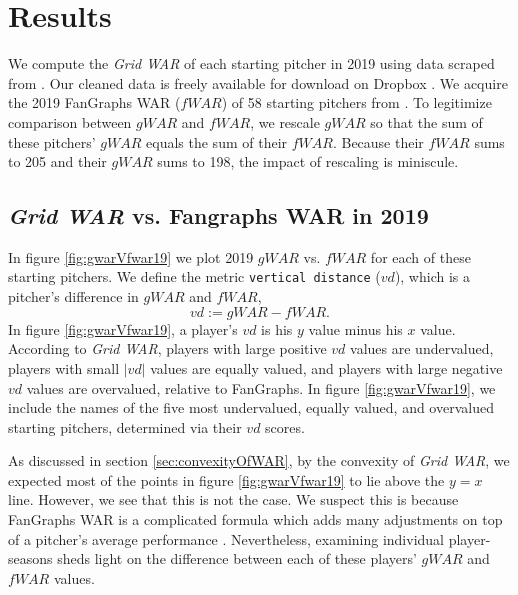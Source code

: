 \documentclass[12pt]{article}
\begin{document}
\section{Results}

We compute the \textit{Grid WAR} of each starting pitcher in 2019 using data scraped from \citet{retroRaw}. Our cleaned data is freely available for download on Dropbox \citep{dropboxRetrosheet}. We acquire the 2019 FanGraphs WAR ($fWAR$) of 58 starting pitchers from \citet{Fangraphs2019War}. To legitimize comparison between $gWAR$ and $fWAR$, we rescale $gWAR$ so that the sum of these pitchers' $gWAR$ equals the sum of their $fWAR$. Because their $fWAR$ sums to 205 and their $gWAR$ sums to 198, the impact of rescaling is miniscule. 

\subsection{\textit{Grid WAR} vs. Fangraphs WAR in 2019}

In figure \ref{fig:gwarVfwar19} we plot 2019 $gWAR$ vs. $fWAR$ for each of these starting pitchers. We define the metric \texttt{vertical distance} ($vd$), which is a pitcher's difference in $gWAR$ and $fWAR$,
\begin{equation}
vd := gWAR - fWAR.
\label{eqn:vd}
\end{equation}
In figure \ref{fig:gwarVfwar19}, a player's $vd$ is his $y$ value minus his $x$ value. According to \textit{Grid WAR}, players with large positive $vd$ values are undervalued, players with small $|vd|$ values are equally valued, and players with large negative $vd$ values are overvalued, relative to FanGraphs. In figure \ref{fig:gwarVfwar19}, we include the names of the five most undervalued, equally valued, and overvalued starting pitchers, determined via their $vd$ scores. 

As discussed in section \ref{sec:convexityOfWAR}, by the convexity of \textit{Grid WAR}, we expected most of the points in figure \ref{fig:gwarVfwar19} to lie above the $y=x$ line. However, we see that this is not the case. We suspect this is because FanGraphs WAR is a complicated formula which adds many adjustments on top of a pitcher's average performance \citep{war_FG}. Nevertheless, examining individual player-seasons sheds light on the difference between each of these players' $gWAR$ and $fWAR$ values. 
\end{document}
